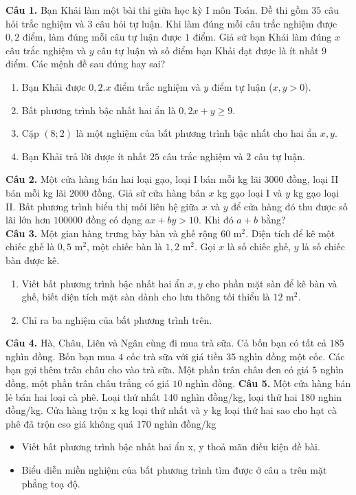 \documentclass[12pt,a4paper]{extarticle}
\begin{document}
\makeheadbox[headerright={Tổng ôn 10-11},chude={CHỦ ĐỀ 02},tieude={Bất phương trình bậc nhất hai ẩn, hệ bất phương trình bậc nhất hai ẩn và Quy hoạch tuyến tính},dinhdang={Đại số},lop={12 },gv={Nguyễn Lê Minh Ngọc}]

\vspace{2em}
\textbf{Câu 1.} Bạn Khải làm một bài thi giữa học kỳ I môn Toán. Đề thi gồm $35$ câu hỏi trắc nghiệm và $3$ câu hỏi tự luận. Khi làm đúng mỗi câu trắc nghiệm được $0{,}2$ điểm, làm đúng mỗi câu tự luận được $1$ điểm. Giả sử bạn Khải làm đúng $x$ câu trắc nghiệm và $y$ câu tự luận và số điểm bạn Khải đạt được là ít nhất $9$ điểm. Các mệnh đề sau đúng hay sai?
    \begin{enumerate}
        \item Bạn Khải được $0{,}2.x$ điểm trắc nghiệm và $y$ điểm tự luận ($x, y > 0$).
        \item Bất phương trình bậc nhất hai ẩn là $0{,}2x + y \ge 9$.
        \item Cặp $(8; 2)$ là một nghiệm của bất phương trình bậc nhất cho hai ẩn $x, y$.
        \item Bạn Khải trả lời được ít nhất $25$ câu trắc nghiệm và $2$ câu tự luận.
    \end{enumerate}
\textbf{Câu 2.} Một cửa hàng bán hai loại gạo, loại I bán mỗi kg lãi $3000$ đồng, loại II bán mỗi kg lãi $2000$ đồng. Giả sử cửa hàng bán $x$ kg gạo loại I và $y$ kg gạo loại II. Bất phương trình biểu thị mối liên hệ giữa $x$ và $y$ để cửa hàng đó thu được số lãi lớn hơn $100000$ đồng có dạng $ax + by > 10$. Khi đó $a + b$ bằng?\\
\vspace{0.5cm}
\textbf{Câu 3.} Một gian hàng trưng bày bàn và ghế rộng $60\text{ m}^2$. Diện tích để kê một chiếc ghế là $0{,}5\text{ m}^2$, một chiếc bàn là $1{,}2\text{ m}^2$. Gọi $x$ là số chiếc ghế, $y$ là số chiếc bàn được kê.
    \begin{enumerate}
        \item Viết bất phương trình bậc nhất hai ẩn $x, y$ cho phần mặt sàn để kê bàn và ghế, biết diện tích mặt sàn dành cho lưu thông tối thiểu là $12\text{ m}^2$.
        \item Chỉ ra ba nghiệm của bất phương trình trên.
    \end{enumerate}
\textbf{Câu 4.} Hà, Châu, Liên và Ngân cùng đi mua trà sữa. Cả bốn bạn có tất cả $185$ nghìn đồng. Bốn bạn mua $4$ cốc trà sữa với giá tiền $35$ nghìn đồng một cốc. Các bạn gọi thêm trân châu cho vào trà sữa. Một phần trân châu đen có giá $5$ nghìn đồng, một phần trân châu trắng có giá $10$ nghìn đồng.
\textbf{Câu 5.} Một cửa hàng bán lẻ bán hai loại cà phê. Loại thứ nhất 140 nghìn đồng/kg, loại thứ hai 180 nghin đồng/kg. Cửa hàng trộn x kg loại thứ nhất và y kg loại thứ hai sao cho hạt cà phê đã trộn cso giá không quá 170 nghìn đồng/kg
\begin{itemize}
    \item Viết bất phương trình bậc nhất hai ẩn x, y thoả mãn điều kiện đề bài.
    \item Biểu diễn miền nghiệm của bất phương trình tìm được ở câu a trên mặt phẳng toạ độ.
\end{itemize}
\end{document}
